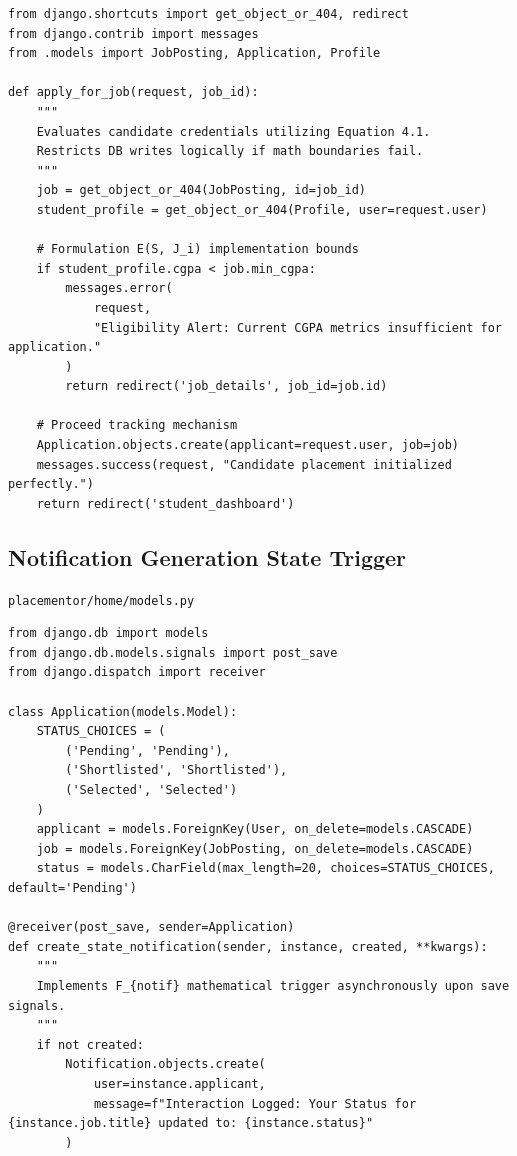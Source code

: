 \documentclass[a4paper,12pt]{report}
\begin{document}
\begin{lstlisting}[caption={Python implementation enforcing Algorithmic Eligibility Checks}]
from django.shortcuts import get_object_or_404, redirect
from django.contrib import messages
from .models import JobPosting, Application, Profile

def apply_for_job(request, job_id):
    """
    Evaluates candidate credentials utilizing Equation 4.1.
    Restricts DB writes logically if math boundaries fail.
    """
    job = get_object_or_404(JobPosting, id=job_id)
    student_profile = get_object_or_404(Profile, user=request.user)

    # Formulation E(S, J_i) implementation bounds
    if student_profile.cgpa < job.min_cgpa:
        messages.error(
            request, 
            "Eligibility Alert: Current CGPA metrics insufficient for application."
        )
        return redirect('job_details', job_id=job.id)

    # Proceed tracking mechanism
    Application.objects.create(applicant=request.user, job=job)
    messages.success(request, "Candidate placement initialized perfectly.")
    return redirect('student_dashboard')
\end{lstlisting}

\subsection*{Notification Generation State Trigger}
\texttt{placementor/home/models.py}

\begin{lstlisting}[caption={Object Relational Method automatically pushing status iterations into the Database ledger.}]
from django.db import models
from django.db.models.signals import post_save
from django.dispatch import receiver

class Application(models.Model):
    STATUS_CHOICES = (
        ('Pending', 'Pending'),
        ('Shortlisted', 'Shortlisted'),
        ('Selected', 'Selected')
    )
    applicant = models.ForeignKey(User, on_delete=models.CASCADE)
    job = models.ForeignKey(JobPosting, on_delete=models.CASCADE)
    status = models.CharField(max_length=20, choices=STATUS_CHOICES, default='Pending')

@receiver(post_save, sender=Application)
def create_state_notification(sender, instance, created, **kwargs):
    """
    Implements F_{notif} mathematical trigger asynchronously upon save signals.
    """
    if not created: 
        Notification.objects.create(
            user=instance.applicant,
            message=f"Interaction Logged: Your Status for {instance.job.title} updated to: {instance.status}"
        )
\end{lstlisting}
\end{document}
